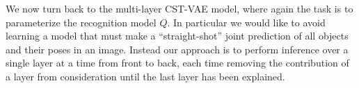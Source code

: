 

We now turn back to the multi-layer CST-VAE model, where again the task is to parameterize the recognition model $Q$. 
In particular we would like to 
avoid learning a model that must make a ``straight-shot'' joint prediction of all objects and their poses in an image.
Instead our approach is to perform inference over a single layer at a time from front to back, each time removing the contribution of a layer
from consideration until the last layer has been explained.


